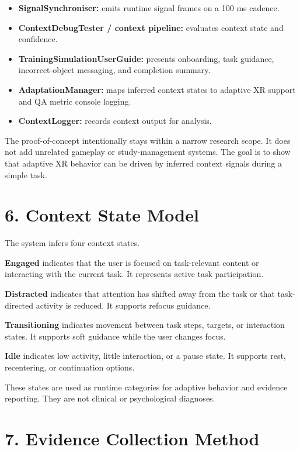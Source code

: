 \documentclass[
  10pt,
]{article}
\providecommand{\tightlist}{%
  \setlength{\itemsep}{0pt}\setlength{\parskip}{0pt}}
\begin{document}
\begin{itemize}
\tightlist
\item
  \textbf{SignalSynchroniser:} emits runtime signal frames on a 100 ms
  cadence.
\item
  \textbf{ContextDebugTester / context pipeline:} evaluates context
  state and confidence.
\item
  \textbf{TrainingSimulationUserGuide:} presents onboarding, task
  guidance, incorrect-object messaging, and completion summary.
\item
  \textbf{AdaptationManager:} maps inferred context states to adaptive
  XR support and QA metric console logging.
\item
  \textbf{ContextLogger:} records context output for analysis.
\end{itemize}

The proof-of-concept intentionally stays within a narrow research scope.
It does not add unrelated gameplay or study-management systems. The goal
is to show that adaptive XR behavior can be driven by inferred context
signals during a simple task.

\section{6. Context State Model}\label{context-state-model}

The system infers four context states.

\textbf{Engaged} indicates that the user is focused on task-relevant
content or interacting with the current task. It represents active task
participation.

\textbf{Distracted} indicates that attention has shifted away from the
task or that task-directed activity is reduced. It supports refocus
guidance.

\textbf{Transitioning} indicates movement between task steps, targets,
or interaction states. It supports soft guidance while the user changes
focus.

\textbf{Idle} indicates low activity, little interaction, or a pause
state. It supports rest, recentering, or continuation options.

These states are used as runtime categories for adaptive behavior and
evidence reporting. They are not clinical or psychological diagnoses.

\section{7. Evidence Collection
Method}\label{evidence-collection-method}
\end{document}
